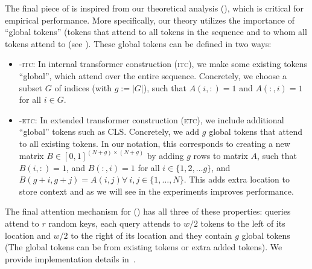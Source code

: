 The final piece of \bigb is inspired from our theoretical analysis  (), which is critical for empirical performance. 
More specifically, our theory utilizes the importance of ``global tokens'' (tokens that attend to all tokens in the sequence and to whom all tokens attend to (see ). 
These global tokens can be defined in two ways:
\begin{itemize}[leftmargin=6mm, itemsep=2mm, partopsep=0pt,parsep=0pt]
    \item \bigb-\textsc{itc}: In internal transformer construction (\textsc{itc}), we make some existing tokens ``global'', which attend over the entire sequence. Concretely, we choose a subset $G$ of indices 
    (with $g:=|G|$), such that $A(i, :) = 1$ and $A(:,i) =1$ for all $i \in G$. %
    \item \bigb-\textsc{etc}: In extended transformer construction (\textsc{etc}), we include additional ``global'' tokens such as CLS. Concretely, we add $g$ global tokens that attend to all existing tokens. In our notation, this corresponds to creating a new matrix $B \in [0, 1]^{(N+g)\times (N+g)}$ by adding $g$ rows to matrix $A$, such that $B(i,:) = 1$, and $B(:, i) =1$ for all $i \in \{1,2, \ldots g\}$, and $B(g+i, g+j) = A(i, j) \forall\ i,j \in \{1, \ldots, N \}$. This adds extra location to store context and as we will see in the experiments improves performance.
\end{itemize}

The final attention mechanism for \bigb () has all three of these properties: queries attend to $r$ random keys, each query attends to $w/2$ tokens to the left of its location and $w/2$ to the right of its location and they contain $g$ global tokens (The global tokens can be from existing tokens or extra added tokens).
We provide implementation details in~.
